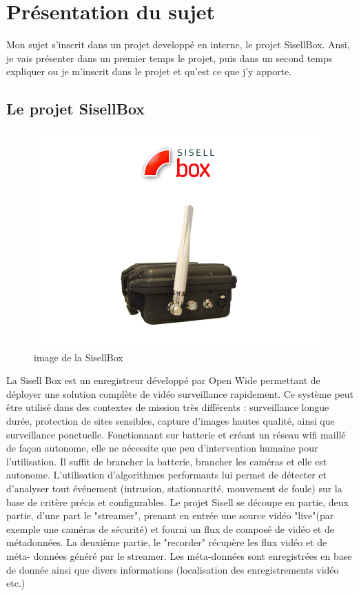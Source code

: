 \chapter{Présentation du sujet}
Mon sujet s'inscrit dans un projet developpé en interne, le projet SisellBox. Ansi,
je vais présenter dans un premier temps le projet, puis dans un second temps
expliquer ou je m'inscrit dans le projet et qu'est ce que j'y apporte.



\section{Le projet SisellBox}
\label{sisselbox}

\begin{figure}[!h]
  \centering
  \includegraphics[scale=0.7]{figures/sbox}
  \caption{image de la SisellBox}
\end{figure}
\newpage
La Sisell Box est un enregistreur développé par Open Wide permettant de déployer une solution complète de vidéo surveillance rapidement.
Ce système peut être utilisé dans des contextes de mission très différents : surveillance longue durée, protection de sites sensibles, capture d'images hautes qualité, ainsi que surveillance ponctuelle.
Fonctionnant sur batterie et créant un réseau wifi maillé de façon autonome, elle ne nécessite que peu d'intervention humaine pour l'utilisation. Il suffit de brancher la batterie, brancher les caméras et elle est autonome. L'utilisation d'algorithmes performants lui permet de détecter et d'analyser tout événement (intrusion, stationnarité, mouvement de foule) sur la base de critère précis et configurables. Le projet Sisell se découpe en partie, deux partie, d'une part le "streamer", prenant en entrée une source vidéo "live"(par exemple une caméras de sécurité) et fourni un flux de composé de vidéo et de métadonnées. La deuxième partie, le "recorder" récupère les flux vidéo et de méta- données généré par le streamer. Les méta-données sont enregistrées en base de donnée ainsi que divers informations (localisation des enregistrements vidéo etc.)

